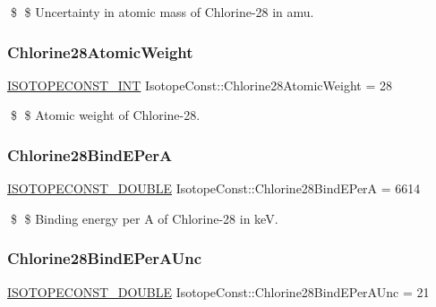 \$ \$ Uncertainty in atomic mass of Chlorine-\/28 in amu. \mbox{\label{group___isotope_const-_chlorine-_cl28_gad6ef2805588356089993b95c1b5b4e06}} 
\subsubsection{\texorpdfstring{Chlorine28\+Atomic\+Weight}{Chlorine28AtomicWeight}}
{\footnotesize\ttfamily \mbox{\hyperlink{group___isotope_const-_macros_ga5f18360b3e99483a35c32d789e62621c}{I\+S\+O\+T\+O\+P\+E\+C\+O\+N\+S\+T\+\_\+\+I\+NT}} Isotope\+Const\+::\+Chlorine28\+Atomic\+Weight = 28}

\$ \$ Atomic weight of Chlorine-\/28. \mbox{\label{group___isotope_const-_chlorine-_cl28_ga6769c7ea5d4479fb1ffd07b1c6efb4d1}} 
\subsubsection{\texorpdfstring{Chlorine28\+Bind\+E\+PerA}{Chlorine28BindEPerA}}
{\footnotesize\ttfamily \mbox{\hyperlink{group___isotope_const-_macros_ga8f45a7272ce02c0b4c65c44636ed719a}{I\+S\+O\+T\+O\+P\+E\+C\+O\+N\+S\+T\+\_\+\+D\+O\+U\+B\+LE}} Isotope\+Const\+::\+Chlorine28\+Bind\+E\+PerA = 6614}

\$ \$ Binding energy per A of Chlorine-\/28 in keV. \mbox{\label{group___isotope_const-_chlorine-_cl28_gaa318b92f52db30af72dbf0688595949e}} 
\subsubsection{\texorpdfstring{Chlorine28\+Bind\+E\+Per\+A\+Unc}{Chlorine28BindEPerAUnc}}
{\footnotesize\ttfamily \mbox{\hyperlink{group___isotope_const-_macros_ga8f45a7272ce02c0b4c65c44636ed719a}{I\+S\+O\+T\+O\+P\+E\+C\+O\+N\+S\+T\+\_\+\+D\+O\+U\+B\+LE}} Isotope\+Const\+::\+Chlorine28\+Bind\+E\+Per\+A\+Unc = 21}

